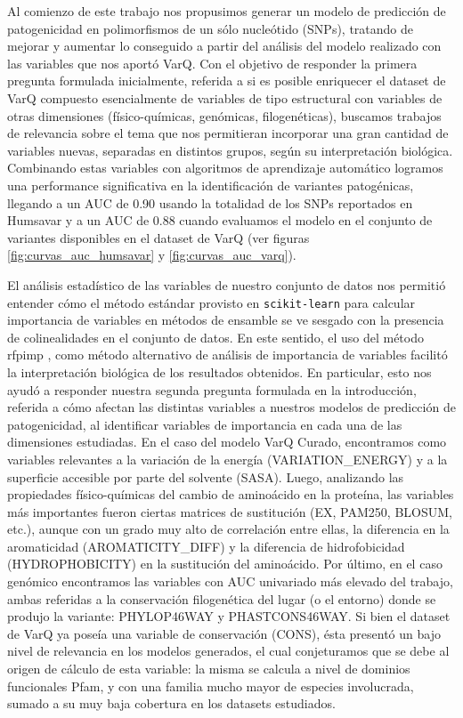 Al comienzo de este trabajo nos propusimos generar un modelo de predicción de patogenicidad en polimorfismos de un sólo nucleótido (SNPs), tratando de mejorar y aumentar lo conseguido a partir del análisis del modelo realizado con las variables que nos aportó VarQ. Con el objetivo de responder la primera pregunta formulada inicialmente, referida a si es posible enriquecer el dataset de VarQ compuesto esencialmente de variables de tipo estructural con variables de otras dimensiones (físico-químicas, genómicas, filogenéticas), buscamos trabajos de relevancia sobre el tema que nos permitieran incorporar una gran cantidad de variables nuevas, separadas en distintos grupos, según su interpretación biológica. Combinando estas variables con algoritmos de aprendizaje automático logramos una performance significativa en la identificación de variantes patogénicas, llegando a un AUC de 0.90 usando la totalidad de los SNPs reportados en Humsavar y a un AUC de 0.88 cuando evaluamos el modelo en el conjunto de variantes disponibles en el dataset de VarQ (ver figuras \ref{fig:curvas_auc_humsavar} y \ref{fig:curvas_auc_varq}).

El análisis estadístico de las variables de nuestro conjunto de datos nos permitió entender cómo el método estándar provisto en \texttt{scikit-learn} para calcular importancia de variables en métodos de ensamble se ve sesgado con la presencia de colinealidades en el conjunto de datos. En este sentido, el uso del método rfpimp \cite{rfpimp}, como método alternativo de análisis de importancia de variables facilitó la interpretación biológica de los resultados obtenidos. En particular, esto nos ayudó a responder nuestra segunda pregunta formulada en la introducción, referida a cómo afectan las distintas variables a nuestros modelos de predicción de patogenicidad, al identificar variables de importancia en cada una de las dimensiones estudiadas. En el caso del modelo VarQ Curado, encontramos como variables relevantes a la variación de la energía (VARIATION\_ENERGY) y a la superficie accesible por parte del solvente (SASA). Luego, analizando las propiedades físico-químicas del cambio de aminoácido en la proteína, las variables más importantes fueron ciertas matrices de sustitución (EX, PAM250, BLOSUM, etc.), aunque con un grado muy alto de correlación entre ellas, la diferencia en la aromaticidad (AROMATICITY\_DIFF) y la diferencia de hidrofobicidad (HYDROPHOBICITY) en la sustitución del aminoácido. Por último, en el caso genómico encontramos las variables con AUC univariado más elevado del trabajo, ambas referidas a la conservación filogenética del lugar (o el entorno) donde se produjo la variante: PHYLOP46WAY y PHASTCONS46WAY. Si bien el dataset de VarQ ya poseía una variable de conservación (CONS), ésta presentó un bajo nivel de relevancia en los modelos generados, el cual conjeturamos que se debe al origen de cálculo de esta variable: la misma se calcula a nivel de dominios funcionales Pfam, y con una familia mucho mayor de especies involucrada, sumado a su muy baja cobertura en los datasets estudiados.

